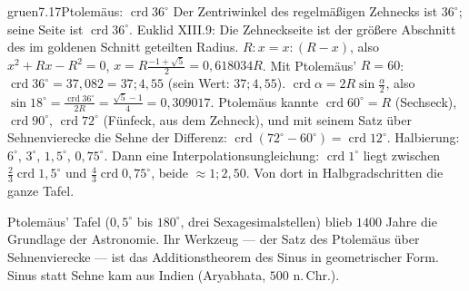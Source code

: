 \begin{loesungkarte}{gruen}{7.17}{Ptolemäus: $\operatorname{crd}36^{\circ}$}
Der Zentriwinkel des regelmäßigen Zehnecks ist $36^{\circ}$; seine Seite ist $\operatorname{crd}36^{\circ}$. Euklid XIII.9: Die Zehneckseite ist der größere Abschnitt des im goldenen Schnitt geteilten Radius.
$R : x = x : (R - x)$, also $x^{2} + Rx - R^{2} = 0$, $x = R\frac{-1 + \sqrt5}2 = 0{,}618034R$. Mit Ptolemäus' $R = 60$: $\operatorname{crd}36^{\circ} = 37{,}082 = 37;4,55$ (sein Wert: $37;4,55$).
$\operatorname{crd}\alpha = 2R\sin\frac\alpha2$, also $\sin18^{\circ} = \frac{\operatorname{crd}36^{\circ}}{2R} = \frac{\sqrt5 - 1}4 = 0{,}309017$.
Ptolemäus kannte $\operatorname{crd}60^{\circ} = R$ (Sechseck), $\operatorname{crd}90^{\circ}$, $\operatorname{crd}72^{\circ}$ (Fünfeck, aus dem Zehneck), und mit seinem Satz über Sehnenvierecke die Sehne der Differenz: $\operatorname{crd}(72^{\circ} - 60^{\circ}) = \operatorname{crd}12^{\circ}$. Halbierung: $6^{\circ}$, $3^{\circ}$, $1{,}5^{\circ}$, $0{,}75^{\circ}$. Dann eine Interpolationsungleichung: $\operatorname{crd}1^{\circ}$ liegt zwischen $\frac23\operatorname{crd}1{,}5^{\circ}$ und $\frac43\operatorname{crd}0{,}75^{\circ}$, beide $\approx1;2,50$. Von dort in Halbgradschritten die ganze Tafel.
\begin{mitnehmen}\kastentext
Ptolemäus' Tafel ($0{,}5^{\circ}$ bis $180^{\circ}$, drei Sexagesimalstellen) blieb $1400$ Jahre die Grundlage der Astronomie. Ihr Werkzeug --- der Satz des Ptolemäus über Sehnenvierecke --- ist das Additionstheorem des Sinus in geometrischer Form. Sinus statt Sehne kam aus Indien (Aryabhata, $500$ n.\,Chr.).
\end{mitnehmen}
\end{loesungkarte}

